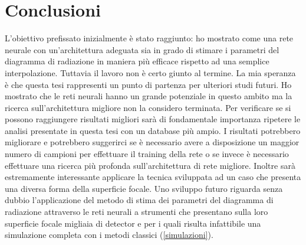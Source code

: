 \documentclass[12pt,a4paper,final]{book}
\begin{document}

\chapter{Conclusioni}\label{conclusioni}
L'obiettivo prefissato inizialmente è stato raggiunto: ho mostrato come una rete neurale con un'architettura adeguata sia in grado
di stimare i parametri del diagramma di radiazione in maniera più efficace rispetto ad una semplice interpolazione.
Tuttavia il lavoro non è certo giunto al termine. La mia speranza è che questa tesi rappresenti un punto di partenza per ulteriori studi futuri. Ho mostrato che le reti neurali hanno un grande potenziale in questo ambito ma la ricerca sull'architettura migliore non la considero terminata. 
Per verificare se si possono raggiungere risultati migliori sarà di fondamentale importanza ripetere le analisi presentate in questa tesi con un database più ampio. I risultati potrebbero migliorare e potrebbero suggerirci se è necessario avere a disposizione un maggior numero di campioni  per effettuare il training della rete o se invece è necessario effettuare una ricerca più profonda sull'architettura di rete migliore.
Inoltre sarà estremamente interessante applicare la tecnica sviluppata ad un caso che presenta una diversa forma della superficie focale.
Uno sviluppo futuro riguarda senza dubbio l'applicazione del metodo di stima dei parametri del diagramma di radiazione attraverso le reti neurali a strumenti che presentano sulla loro superficie focale migliaia di detector e per i quali risulta infattibile una simulazione completa con i metodi classici (\ref{simulazioni}).



\nocite{*}
{}

\end{document}
